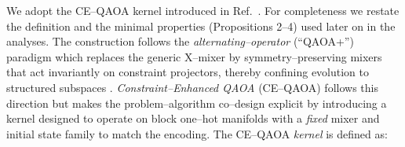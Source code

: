 \documentclass[a4paper,unpublished,onecolumn,11pt]{quantumarticle}
\theoremstyle{definition}
\theoremstyle{remark}
\begin{document}
We adopt the CE–QAOA kernel introduced in Ref.~\cite{onahce}.  For completeness we restate the definition and the minimal properties (Propositions 2–4) used later on in the analyses.  The construction follows the  \emph{alternating–operator} (``QAOA+'') paradigm\cite{Hadfield2019AOA} which replaces the generic X–mixer by  symmetry–preserving mixers that act invariantly on  constraint projectors, thereby confining evolution to structured subspaces \cite{Hadfield2019AOA,Fuchs2022ConstrainedMixers, tsvelikhovskiy2024symmetries}. 
\emph{Constraint–Enhanced QAOA} (CE–QAOA) \cite{onahce} follows this direction but makes the problem–algorithm co–design explicit by introducing a kernel designed to operate on block one–hot manifolds with a \emph{fixed} mixer and initial state family to match the encoding. The CE–QAOA \emph{kernel} is defined as:
\end{document}
